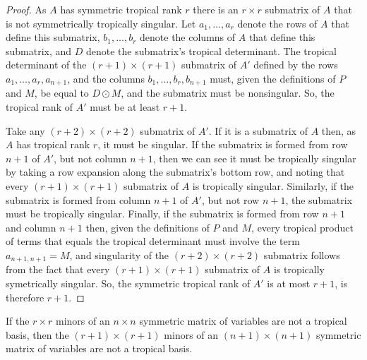 \documentclass{article}
\begin{document}
\begin{proof}
  As $A$ has symmetric tropical rank $r$ there is an $r \times r$ submatrix of $A$ that is not symmetrically tropically singular. Let $a_{1},\ldots,a_{r}$ denote the rows of $A$ that define this submatrix, $b_{1},\ldots,b_{r}$ denote the columns of $A$ that define this submatrix, and $D$ denote the submatrix's tropical determinant. The tropical determinant of the $(r+1) \times (r+1)$ submatrix of $A'$ defined by the rows $a_{1},\ldots,a_{r},a_{n+1}$, and the columns $b_{1},\ldots,b_{r},b_{n+1}$ must, given the definitions of $P$ and $M$, be equal to $D \odot M$, and the submatrix must be nonsingular. So, the tropical rank of $A'$ must be at least $r+1$.
  
  Take any $(r+2) \times (r+2)$ submatrix of $A'$. If it is a submatrix of $A$ then, as $A$ has tropical rank $r$, it must be singular. If the submatrix is formed from row $n+1$ of $A'$, but not column $n+1$, then we can see it must be tropically singular by taking a row expansion along the submatrix's bottom row, and noting that every $(r+1) \times (r+1)$ submatrix of $A$ is tropically singular. Similarly, if the submatrix is formed from column $n+1$ of $A'$, but not row $n+1$, the submatrix must be tropically singular. Finally, if the submatrix is formed from row $n+1$ and column $n+1$ then, given the definitions of $P$ and $M$, every tropical product of terms that equals the tropical determinant must involve the term $a_{n+1,n+1} = M$, and singularity of the $(r+2) \times (r+2)$ submatrix follows from the fact that every $(r+1) \times (r+1)$ submatrix of $A$ is tropically symetrically singular. So, the symmetric tropical rank of $A'$ is at most $r+1$, is therefore $r+1$.
\end{proof}

\begin{cor}
  If the $r \times r$ minors of an $n \times n$ symmetric matrix of variables are not a tropical basis, then the $(r+1) \times (r+1)$ minors of an $(n+1) \times (n+1)$ symmetric matrix of variables are not a tropical basis.
\end{cor}
\end{document}
